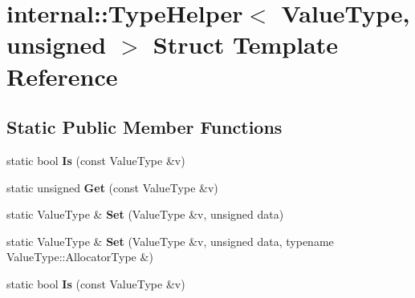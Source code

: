 \hypertarget{structinternal_1_1_type_helper_3_01_value_type_00_01unsigned_01_4}{}\section{internal\+:\+:Type\+Helper$<$ Value\+Type, unsigned $>$ Struct Template Reference}
\label{structinternal_1_1_type_helper_3_01_value_type_00_01unsigned_01_4}
\subsection*{Static Public Member Functions}
\begin{DoxyCompactItemize}
\item 
static bool {\bfseries Is} (const Value\+Type \&v)\hypertarget{structinternal_1_1_type_helper_3_01_value_type_00_01unsigned_01_4_ad1c1cb931ed166508d17e866d410c99b}{}\label{structinternal_1_1_type_helper_3_01_value_type_00_01unsigned_01_4_ad1c1cb931ed166508d17e866d410c99b}

\item 
static unsigned {\bfseries Get} (const Value\+Type \&v)\hypertarget{structinternal_1_1_type_helper_3_01_value_type_00_01unsigned_01_4_a2f91befe1e9e914e7431b84c0d89f572}{}\label{structinternal_1_1_type_helper_3_01_value_type_00_01unsigned_01_4_a2f91befe1e9e914e7431b84c0d89f572}

\item 
static Value\+Type \& {\bfseries Set} (Value\+Type \&v, unsigned data)\hypertarget{structinternal_1_1_type_helper_3_01_value_type_00_01unsigned_01_4_a1d960542fd618ac649fe4e045c44f789}{}\label{structinternal_1_1_type_helper_3_01_value_type_00_01unsigned_01_4_a1d960542fd618ac649fe4e045c44f789}

\item 
static Value\+Type \& {\bfseries Set} (Value\+Type \&v, unsigned data, typename Value\+Type\+::\+Allocator\+Type \&)\hypertarget{structinternal_1_1_type_helper_3_01_value_type_00_01unsigned_01_4_a601b05a233b6025486a9105d45d46780}{}\label{structinternal_1_1_type_helper_3_01_value_type_00_01unsigned_01_4_a601b05a233b6025486a9105d45d46780}

\item 
static bool {\bfseries Is} (const Value\+Type \&v)\hypertarget{structinternal_1_1_type_helper_3_01_value_type_00_01unsigned_01_4_ad1c1cb931ed166508d17e866d410c99b}{}\label{structinternal_1_1_type_helper_3_01_value_type_00_01unsigned_01_4_ad1c1cb931ed166508d17e866d410c99b}


\end{DoxyCompactItemize}
